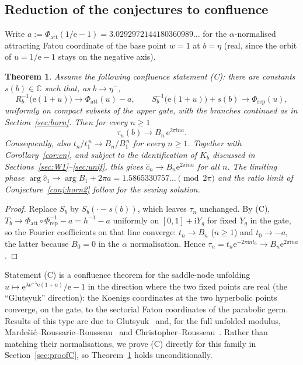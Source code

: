 \documentclass[11pt,a4paper]{article}
\newtheorem{theorem}{Theorem}
\theoremstyle{definition}
\newcommand{\Rr}{R}
\newcommand{\Kk}{K}
\newcommand{\eee}{\mathrm{e}}
\newcommand{\ii}{\mathrm{i}}
\begin{document}
\subsection{Reduction of the conjectures to confluence}

Write $a:=\Phi_{\mathrm{att}}(1/\eee-1)=3.0292972144180360989\ldots$ for the
$\alpha$-normalised attracting Fatou coordinate of the base point $w=1$ at
$b=\eta$ (real, since the orbit of $u=1/\eee-1$ stays on the negative axis).

\begin{theorem}\label{thm:reduction}
Assume the following confluence statement \textup{(C)}: there are constants
$s(b)\in\mathbb C$ such that, as $b\to\eta^-$,
\[
 \Rr_b^{-1}\bigl(\eee(1+u)\bigr)\to\Phi_{\mathrm{att}}(u)-a,\qquad
 S_b^{-1}\bigl(\eee(1+u)\bigr)+s(b)\to\Phi_{\mathrm{rep}}(u),
\]
uniformly on compact subsets of the upper gate, with the branches continued as
in Section~\ref{sec:horn}.  Then for every $n\ge1$
\[
 \tau_n(b)\longrightarrow B_n\,\eee^{2\pi\ii na}.
\]
Consequently, also
$t_n/t_1^{\,n}\to B_n/B_1^{\,n}$ for every $n\ge1$.
Together with Corollary~\ref{cor:cn}, and subject to the identification of
$\Kk_b$ discussed in Sections~\ref{sec:W1}--\ref{sec:unif}, this gives
$\hat c_n\to B_n\eee^{2\pi\ii na}$ for all $n$.  The limiting phase
$\arg\hat c_1\to\arg B_1+2\pi a=1.5865330757\ldots\pmod{2\pi}$
and the ratio limit of Conjecture~\ref{conj:horn2} follow for the sewing solution.
\end{theorem}

\begin{proof}
Replace $S_b$ by $S_b(\cdot-s(b))$, which leaves $\tau_n$ unchanged.  By (C),
$T_b\to\Phi_{\mathrm{att}}\circ\Phi_{\mathrm{rep}}^{-1}-a=h^{-1}-a$ uniformly
on $[0,1]+\ii Y_g$ for fixed $Y_g$ in the gate, so the Fourier coefficients on
that line converge: $t_n\to B_n$ ($n\ge1$) and $t_0\to-a$, the latter because
$B_0=0$ in the $\alpha$ normalisation.  Hence
$\tau_n=t_n\eee^{-2\pi\ii nt_0}\to B_n\eee^{2\pi\ii na}$.
\end{proof}

Statement (C) is a confluence theorem for the saddle-node unfolding
$u\mapsto \eee^{\lambda\eee^{-\lambda}\eee(1+u)}/\eee-1$ in the direction where the
two fixed points are real (the ``Glutsyuk'' direction): the Koenigs
coordinates at the two hyperbolic points converge, on the gate, to the
sectorial Fatou coordinates of the parabolic germ.  Results of this type are
due to Glutsyuk~\cite{Glutsyuk2001} and, for the full unfolded modulus,
Marde\v{s}i\'c--Roussarie--Rousseau~\cite{MRR2004} and
Christopher--Rousseau~\cite{ChristopherRousseau}.  Rather than matching their
normalisations, we prove (C) directly for this family in
Section~\ref{sec:proofC}, so Theorem~\ref{thm:reduction} holds unconditionally.
\end{document}
